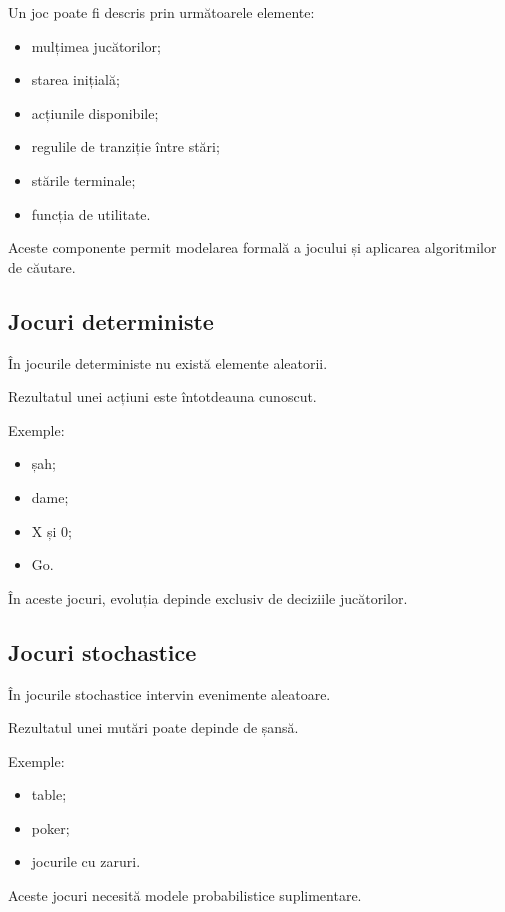 \documentclass[12pt,a4paper]{article}
\begin{document}
Un joc poate fi descris prin următoarele elemente:

\begin{itemize}
\item mulțimea jucătorilor;
\item starea inițială;
\item acțiunile disponibile;
\item regulile de tranziție între stări;
\item stările terminale;
\item funcția de utilitate.
\end{itemize}

Aceste componente permit modelarea formală a jocului și aplicarea algoritmilor de căutare.

\subsection{Jocuri deterministe}

În jocurile deterministe nu există elemente aleatorii.

Rezultatul unei acțiuni este întotdeauna cunoscut.

Exemple:

\begin{itemize}
\item șah;
\item dame;
\item X și 0;
\item Go.
\end{itemize}

În aceste jocuri, evoluția depinde exclusiv de deciziile jucătorilor.

\subsection{Jocuri stochastice}

În jocurile stochastice intervin evenimente aleatoare.

Rezultatul unei mutări poate depinde de șansă.

Exemple:

\begin{itemize}
\item table;
\item poker;
\item jocurile cu zaruri.
\end{itemize}

Aceste jocuri necesită modele probabilistice suplimentare.
\end{document}
